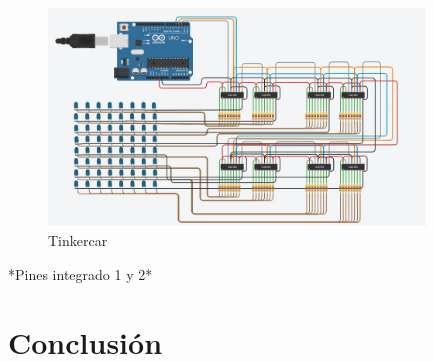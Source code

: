 \documentclass{article}
\begin{document}
  \vspace{1cm}
 
\begin{figure}[h]
\includegraphics[width=10cm]{Tinkercar.jpeg}
\centering
\caption{Tinkercar}
\label{fig:gestion}
\end{figure}


 
 \vspace{1cm}
 
  *Pines integrado 1 y 2*

\vspace{1cm}


\vspace{8cm}
\section{Conclusión} \label{conclulsion}




\vspace{1cm}
\end{document}

